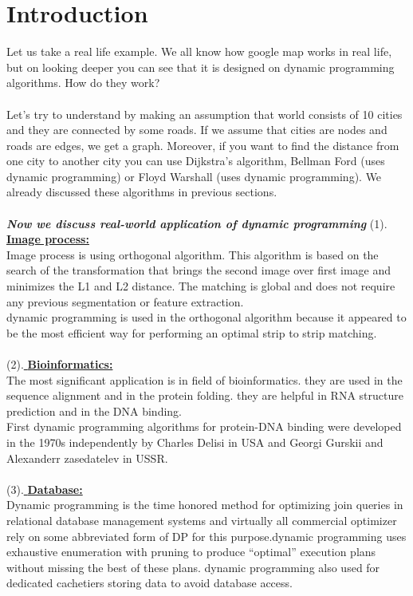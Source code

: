 \documentclass[12pt]{book}
\begin{document}
 \chapter{Introduction}
  Let us take a real life example. We all know how google map works in real life, but on looking deeper you can see that it is designed on dynamic programming algorithms. How do they work?\\\\
 Let's try to understand by making an assumption that world consists of 10 cities and they are connected by some roads. If we assume that cities are nodes and roads are edges, we get a graph. Moreover, if you want to find the distance from one city to another city you can use Dijkstra's algorithm, Bellman Ford (uses dynamic programming) or Floyd Warshall (uses dynamic programming). We already discussed these algorithms in previous sections.\\\\
  \textbf{\textit{Now we discuss real-world application of dynamic programming}}\newline\newline
(1).\underline{
\textbf{Image process:}}\\
 Image process is using orthogonal algorithm. This algorithm is based on the search of the transformation that brings the second image over first image and minimizes the L1 and L2 distance. The matching is global and does not require any previous segmentation or feature extraction.\\
 dynamic programming is used in the orthogonal algorithm because it appeared to be the most efficient way for performing an optimal strip to strip matching. 
\\\\
(2).\underline{
\textbf{Bioinformatics:}}\\
The most significant application is in field of bioinformatics. they are used in the sequence alignment and in the protein folding.
they are helpful in RNA structure prediction and in the DNA binding.\\
First dynamic programming algorithms for protein-DNA binding were developed in the 1970s independently by Charles Delisi in USA and Georgi Gurskii and Alexanderr zasedatelev in USSR.
\\\\
(3).\underline{
\textbf{Database:}}\\
Dynamic programming is the time honored method for optimizing join queries in relational database management systems and virtually all commercial optimizer rely on some abbreviated form of DP for this purpose.dynamic programming  uses  exhaustive enumeration with pruning to produce “optimal” execution plans without missing the best of these plans. dynamic programming also used for dedicated cachetiers storing data to avoid database access.
\end{document}
